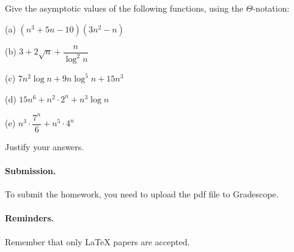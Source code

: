 \documentclass{article}
\begin{document}

\begin{problem}
Give the asymptotic values of the
following functions, using the $\Theta$-notation:
%
\begin{description}
%
\item{(a)} $ (n^3 + 5 n - 10)( 3 n^2 - n)$
\item{(b)} $3 + 2 \sqrt{n} + \dfrac{n}{\log^2 n}$
\item{(c)} $7n^2\log n + 9 n\log^5n + 15n^3$
\item{(d)} $15n^6 + n^2\cdot 2^n + n^3\log n$
\item{(e)} $n^3 \cdot \dfrac{7^n}{6} + n^5 \cdot 4^n$
%
\end{description}
%
Justify your answers.

\end{problem}


\vskip 0.1in
\paragraph{Submission.}
To submit the homework, you need to upload the pdf file to Gradescope.

\paragraph{Reminders.}
Remember that only {\LaTeX} papers are accepted. 
\end{document}
